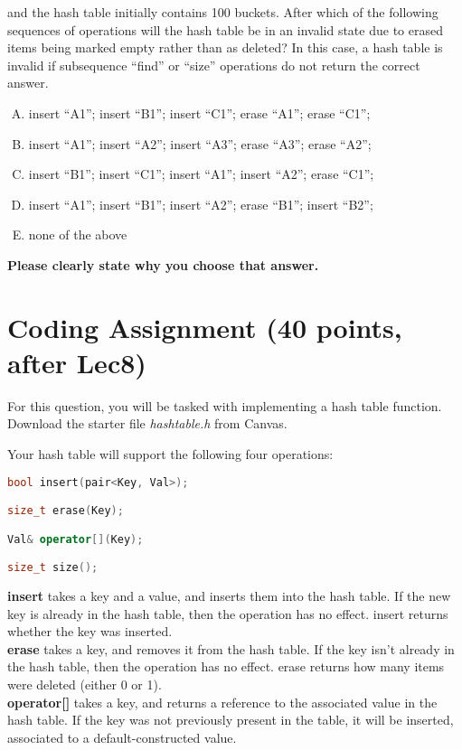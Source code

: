 \documentclass[11pt]{exam}
\begin{document}
and the hash table initially contains 100 buckets. After which of the following sequences of operations will the hash table be in an invalid state due to erased items being marked empty rather than as deleted? In this case, a hash table is invalid if subsequence “find” or “size” operations do not return the correct answer.
\begin{enumerate}[A.]
\item insert “A1”; insert “B1”; insert “C1”; erase “A1”; erase “C1”;
\item insert “A1”; insert “A2”; insert “A3”; erase “A3”; erase “A2”;
\item insert “B1”; insert “C1”; insert “A1”; insert “A2”; erase “C1”;
\item insert “A1”; insert “B1”; insert “A2”; erase “B1”; insert “B2”;
\item none of the above
\end{enumerate}

\textbf{Please clearly state why you choose that answer.}
\begin{solution}
\end{solution}

\newpage
\section{Coding Assignment (40 points, after Lec8)}
For this question, you will be tasked with implementing a hash table function. Download the starter file \textit{hashtable.h} from Canvas.

Your hash table will support the following four operations:
\begin{lstlisting}[language=c++]
bool insert(pair<Key, Val>);

size_t erase(Key);

Val& operator[](Key);

size_t size();
\end{lstlisting}
\textbf{insert} takes a key and a value, and inserts them into the hash table. If the new key is already in the hash table, then the operation has no effect. insert returns whether the key was inserted.\\

\textbf{erase} takes a key, and removes it from the hash table. If the key isn’t already in the hash table, then the operation has no effect. erase returns how many items were deleted (either 0 or 1).\\

\textbf{operator[]} takes a key, and returns a reference to the associated value in the hash table. If the key was not previously present in the table, it will be inserted, associated to a default-constructed value.\\
\end{document}
